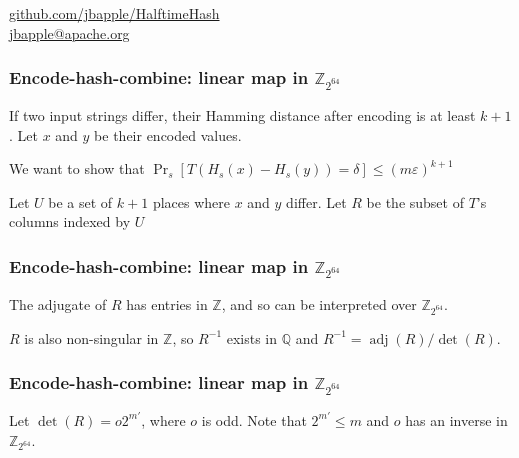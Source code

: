 \documentclass[xcolor=dvipsnames]{beamer}
\DeclareMathOperator{\adj}{adj}
\begin{document}
\begin{frame}
  \begin{center}
    \href{https://github.com/jbapple/HalftimeHash}{github.com/jbapple/HalftimeHash}
    $ $ \\
    $ $ \\
    \href{mailto:jbapple@apache.org}{\Large jbapple@apache.org}
  \end{center}
\end{frame}

\begin{frame}
  \frametitle{Encode-hash-combine: linear map \textbf{ in $\mathbb{Z}_{2^{64}}$}}

  If two input strings differ, their Hamming distance after encoding is at least $k+1$.
  Let $x$ and $y$ be their encoded values.
  \pause

  $ $\\
  We want to show that $\Pr_s\left[T(H_s(x)-H_s(y)) = \delta\right] \le (m \varepsilon)^{k+1}$
  \pause

  $ $\\
  Let $U$ be a set of $k+1$ places where $x$ and $y$ differ.
  Let $R$ be the subset of $T$'s columns indexed by $U$
\end{frame}

\begin{frame}
  \frametitle{Encode-hash-combine: linear map \textbf{ in $\mathbb{Z}_{2^{64}}$}}

  The adjugate of $R$ has entries in $\mathbb{Z}$, and so can be interpreted over $\mathbb{Z}_{2^{64}}$.
  \pause

  $ $\\
  $R$ is also non-singular in $\mathbb{Z}$, so $R^{-1}$ exists in $\mathbb{Q}$ and $R^{-1} = \adj(R) / \det(R)$.
\end{frame}

\begin{frame}
  \frametitle{Encode-hash-combine: linear map \textbf{in $\mathbb{Z}_{2^{64}}$}}

  $ $\\
  Let $\det(R) = o 2^{m'}$, where $o$ is odd. Note that $2^{m'} \le m$ and $o$ has an inverse in $\mathbb{Z}_{2^{64}}$.

\end{frame}
\end{document}
